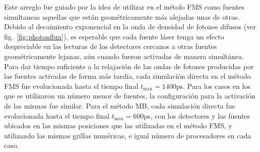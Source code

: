 Este arreglo fue guiado por la idea de utilizar en el métofo FMS como fuentes simultaneas 
aquellas que están geométricamente más alejadas unas de otras. Debido 
al decaimiento exponencial en la onda de densidad de fotones difusos (ver fig.~\ref{fig:photonflux}), es esperable que cada fuente láser tenga un efecto despreciable en las lecturas de los detectores cercanos a otras fuentes geométricamente lejanas, 
aún cuando fueron activadas de manera simultánea. Para dar tiempo suficiente 
a la relajación de las ondas de fotones producidas por las fuentes activadas 
de forma más tardía, cada simulación directa en el método FMS fue evolucionada 
hasta el tiempo final $t_{\text{max}}=1400$ps. Para los casos en los que se utilizaron 
un número menor de fuentes, la configuración para la activación de las mismas 
fue similar. Para el método MB, cada simulación directa fue evolucionada hasta el tiempo 
final $t_{\text{max}}=600$ps, con los detectores y las fuentes ubicados en las mismas 
posiciones que las utilizadas en el método FMS, y utilizando las mismas grillas numéricas, 
e igual número de procesadores en cada caso.

